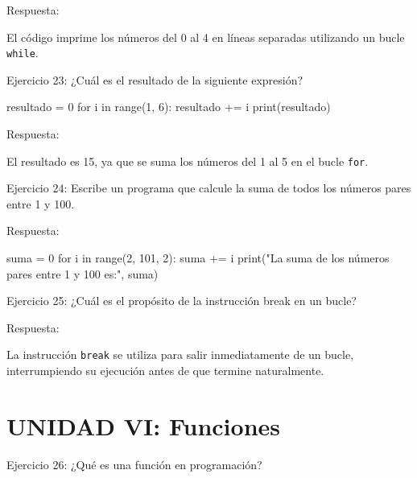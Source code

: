 \documentclass[
  a4paper,
  DIV=11,
  numbers=noendperiod,
  onepage,
  openany]{scrreprt}
\newenvironment{Shaded}{\begin{snugshade}}{\end{snugshade}}
\newcommand{\BuiltInTok}[1]{\textcolor[rgb]{0.00,0.23,0.31}{#1}}
\newcommand{\ControlFlowTok}[1]{\textcolor[rgb]{0.00,0.23,0.31}{#1}}
\newcommand{\DecValTok}[1]{\textcolor[rgb]{0.68,0.00,0.00}{#1}}
\newcommand{\KeywordTok}[1]{\textcolor[rgb]{0.00,0.23,0.31}{#1}}
\newcommand{\NormalTok}[1]{\textcolor[rgb]{0.00,0.23,0.31}{#1}}
\newcommand{\OperatorTok}[1]{\textcolor[rgb]{0.37,0.37,0.37}{#1}}
\newcommand{\StringTok}[1]{\textcolor[rgb]{0.13,0.47,0.30}{#1}}
\begin{document}
Respuesta:

El código imprime los números del 0 al 4 en líneas separadas utilizando
un bucle \texttt{while}.

Ejercicio 23: ¿Cuál es el resultado de la siguiente expresión?

\begin{Shaded}
\begin{Highlighting}[]
\NormalTok{resultado }\OperatorTok{=} \DecValTok{0}
\ControlFlowTok{for}\NormalTok{ i }\KeywordTok{in} \BuiltInTok{range}\NormalTok{(}\DecValTok{1}\NormalTok{, }\DecValTok{6}\NormalTok{):}
\NormalTok{    resultado }\OperatorTok{+=}\NormalTok{ i}
\BuiltInTok{print}\NormalTok{(resultado)}
\end{Highlighting}
\end{Shaded}

Respuesta:

El resultado es 15, ya que se suma los números del 1 al 5 en el bucle
\texttt{for}.

Ejercicio 24: Escribe un programa que calcule la suma de todos los
números pares entre 1 y 100.

Respuesta:

\begin{Shaded}
\begin{Highlighting}[]
\NormalTok{suma }\OperatorTok{=} \DecValTok{0}
\ControlFlowTok{for}\NormalTok{ i }\KeywordTok{in} \BuiltInTok{range}\NormalTok{(}\DecValTok{2}\NormalTok{, }\DecValTok{101}\NormalTok{, }\DecValTok{2}\NormalTok{):}
\NormalTok{    suma }\OperatorTok{+=}\NormalTok{ i}
\BuiltInTok{print}\NormalTok{(}\StringTok{"La suma de los números pares entre 1 y 100 es:"}\NormalTok{, suma)}
\end{Highlighting}
\end{Shaded}

Ejercicio 25: ¿Cuál es el propósito de la instrucción break en un bucle?

Respuesta:

La instrucción \texttt{break} se utiliza para salir inmediatamente de un
bucle, interrumpiendo su ejecución antes de que termine naturalmente.

\hypertarget{unidad-vi-funciones-1}{%
\section{UNIDAD VI: Funciones}\label{unidad-vi-funciones-1}}

Ejercicio 26: ¿Qué es una función en programación?
\end{document}
